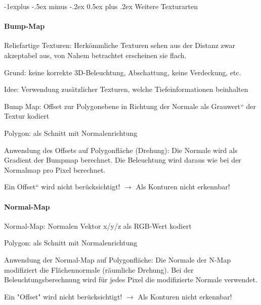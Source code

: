 \documentclass[landscape]{article}
\makeatletter
\renewcommand{\subsection}{\@startsection{subsection}{2}{0mm}%
                                {-1explus -.5ex minus -.2ex}%
                                {0.5ex plus .2ex}%
                                {\normalfont\normalsize\bfseries}}
\makeatother
\begin{document}
\begin{multicols}{3}
  \subsection{ Weitere Texturarten}
  \paragraph{Bump-Map}
  \begin{itemize*}
    \item Reliefartige Texturen: Herkömmliche Texturen sehen aus der Distanz zwar akzeptabel aus, von Nahem betrachtet erscheinen sie flach.
    \item Grund: keine korrekte 3D-Beleuchtung, Abschattung, keine Verdeckung, etc.
    \item Idee: Verwendung zusätzlicher Texturen, welche Tiefeinformationen beinhalten
  \end{itemize*}
  \begin{itemize*}
    \item Bump Map: Offset zur Polygonebene in Richtung der Normale als Grauwert“ der Textur kodiert
    \item Polygon: als Schnitt mit Normalenrichtung
    \item Anwendung des Offsets auf Polygonfläche (Drehung): Die Normale wird als Gradient der Bumpmap berechnet. Die Beleuchtung wird daraus wie bei der Normalmap pro Pixel berechnet.
    \item Ein Offset“ wird nicht berücksichtigt! $\rightarrow$ Als Konturen nicht erkennbar!
  \end{itemize*}
  
  
  \paragraph{Normal-Map}
  \begin{itemize*}
    \item Normal-Map: Normalen Vektor x/y/z als RGB-Wert kodiert
    \item Polygon: als Schnitt mit Normalenrichtung
    \item Anwendung der Normal-Map auf Polygonfläche: Die Normale der N-Map modifiziert die Flächennormale (räumliche Drehung). Bei der Beleuchtungsberechnung wird für jedes Pixel die modifizierte Normale verwendet.
    \item Ein "Offset" wird nicht berücksichtigt! $\rightarrow$ Als Konturen nicht erkennbar!
  \end{itemize*}
  

\end{multicols}
\end{document}
